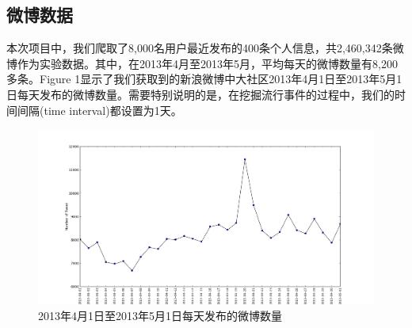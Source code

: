 \documentclass[a4paper]{article}
\begin{document}
\subsection{微博数据}
本次项目中，我们爬取了8,000名用户最近发布的400条个人信息，共2,460,342条微博作为实验数据。其中，在2013年4月至2013年5月，平均每天的微博数量有8,200多条。Figure 1显示了我们获取到的新浪微博中大社区2013年4月1日至2013年5月1日每天发布的微博数量。需要特别说明的是，在挖掘流行事件的过程中，我们的时间间隔(time interval)都设置为1天。
\begin{figure}[htbp]
\centering
\includegraphics[width=5.5in]{num_of_weibo_between_April_May.png}
\caption{2013年4月1日至2013年5月1日每天发布的微博数量}
\label{fig:1}
\end{figure}
\end{document}

